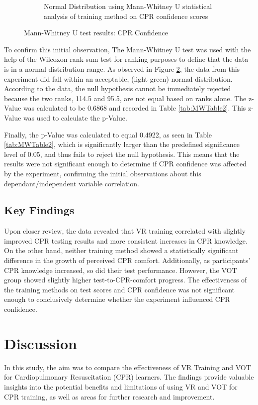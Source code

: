 \documentclass[manuscript]{./Models/acmart}
\begin{document}
\begin{figure}[!t]
\begin{subfigure}[b]{.4\textwidth}
        \caption{Normal Distribution using Mann-Whitney U statistical analysis of training method on CPR confidence scores}
        \label{fig:Pre CPR confidence VS Post confidence group MWU test}   
    \end{subfigure}
    \caption{Mann-Whitney U test results: CPR Confidence}
\end{figure}

To confirm this initial observation, The Mann-Whitney U test was used with the help of the Wilcoxon rank-sum test for ranking purposes to define that the data is in a normal distribution range. As observed in Figure \ref{fig:Pre CPR confidence VS Post confidence group MWU test}, the data from this experiment did fall within an acceptable, (light green) normal distribution. According to the data, the null hypothesis cannot be immediately rejected because the two ranks, 114.5 and 95.5, are not equal based on ranks alone. The z-Value was calculated to be 0.6868 and recorded in Table \ref{tab:MWTable2}. This z-Value was used to calculate the p-Value.

Finally, the p-Value was calculated to equal 0.4922, as seen in Table \ref{tab:MWTable2}, which is significantly larger than the predefined significance level of 0.05, and thus fails to reject the null hypothesis. This means that the results were not significant enough to determine if CPR confidence was affected by the experiment, confirming the initial observations about this dependant/independent variable correlation.

\subsection{Key Findings}
Upon closer review, the data revealed that VR training correlated with slightly improved CPR testing results and more consistent increases in CPR knowledge. On the other hand, neither training method showed a statistically significant difference in the growth of perceived CPR comfort. Additionally, as participants' CPR knowledge increased, so did their test performance. However, the VOT group showed slightly higher test-to-CPR-comfort progress. The effectiveness of the training methods on test scores and CPR confidence was not significant enough to conclusively determine whether the experiment influenced CPR confidence.

\section{Discussion}
In this study, the aim was to compare the effectiveness of VR Training and VOT for Cardiopulmonary Resuscitation (CPR) learners. The findings provide valuable insights into the potential benefits and limitations of using VR and VOT for CPR training, as well as areas for further research and improvement.
\end{document}
